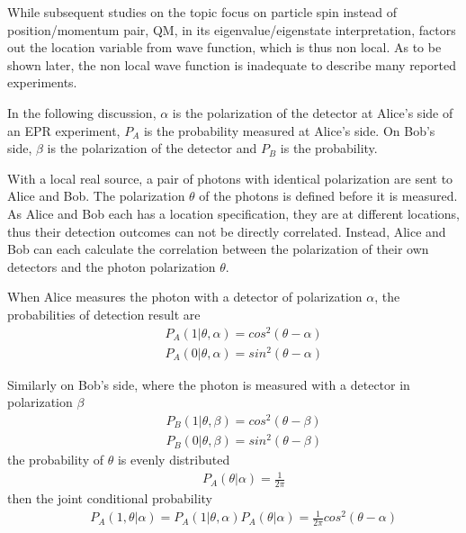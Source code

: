 \documentclass[prd,showpacs,twocolumn]{revtex4-1}
\begin{document}
While subsequent studies on the topic focus on particle spin instead of position/momentum pair, QM, in its eigenvalue/eigenstate interpretation, factors out the location variable from wave function, which is thus non local. As to be shown later, the non local wave function is inadequate to describe many reported experiments.

In the following discussion, $\alpha$ is the polarization of the detector at Alice's side of an EPR experiment, $P_A$ is the probability measured at Alice's side. On Bob's side, $\beta$ is the polarization of the detector and $P_B$ is the probability.

With a local real source, a pair of photons with identical polarization are sent to Alice and Bob. The polarization $\theta$ of the photons is defined before it is measured. As Alice and Bob each has a location specification, they are at different locations, thus their detection outcomes can not be directly correlated. Instead, Alice and Bob can each calculate the correlation between the polarization of their own detectors and the photon polarization $\theta$.

When Alice measures the photon with a detector of polarization $\alpha$, the probabilities of detection result are
\begin{eqnarray}
&&P_A(1|\theta,\alpha)=cos^2(\theta-\alpha)\nonumber\\
&&P_A(0|\theta,\alpha)=sin^2(\theta-\alpha)
\label{eqn:PA}
\end{eqnarray}

Similarly on Bob's side, where the photon is measured with a detector in polarization $\beta$
\begin{eqnarray}
&&P_B(1|\theta,\beta)=cos^2(\theta-\beta)\nonumber\\
&&P_B(0|\theta,\beta)=sin^2(\theta-\beta)
\label{eqn:PB}
\end{eqnarray}
the probability of $\theta$ is evenly distributed
\begin{eqnarray}
&&P_A(\theta|\alpha)=\frac{1}{2\pi}
\end{eqnarray}
then the joint conditional probability
\begin{eqnarray}
&&P_A(1,\theta|\alpha)=P_A(1|\theta,\alpha)P_A(\theta|\alpha)=\frac{1}{2\pi}cos^2(\theta-\alpha)
\end{eqnarray}
\end{document}
